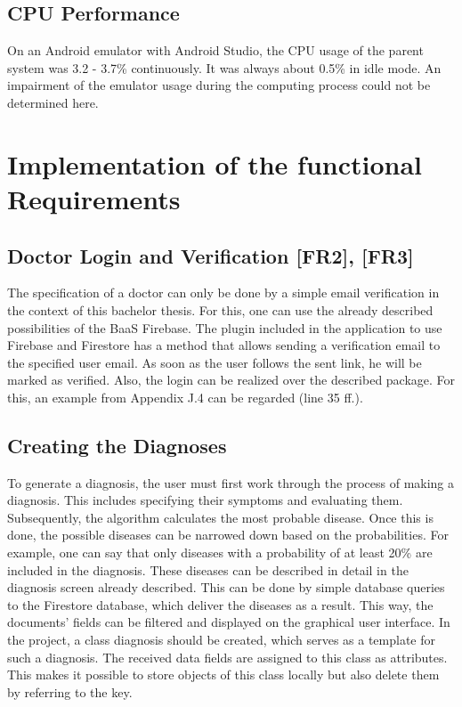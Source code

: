 \subsection{CPU Performance}
On an Android emulator with Android Studio, the CPU usage of the parent system was 3.2 - 3.7\% continuously. It was always about 0.5\% in idle mode. An impairment of the emulator usage during the computing process could not be determined here.

\section{Implementation of the functional Requirements}
\subsection{Doctor Login and Verification [FR2], [FR3]}
The specification of a doctor can only be done by a simple email verification in the context of this bachelor thesis. For this, one can use the already described possibilities of the BaaS Firebase. The plugin included in the application to use Firebase and Firestore has a method that allows sending a verification email to the specified user email. As soon as the user follows the sent link, he will be marked as verified. Also, the login can be realized over the described package. For this, an example from Appendix J.4 can be regarded (line 35 ff.).
\subsection{Creating the Diagnoses}
To generate a diagnosis, the user must first work through the process of making a diagnosis. This includes specifying their symptoms and evaluating them. Subsequently, the algorithm calculates the most probable disease. Once this is done, the possible diseases can be narrowed down based on the probabilities. For example, one can say that only diseases with a probability of at least 20\% are included in the diagnosis. These diseases can be described in detail in the diagnosis screen already described. This can be done by simple database queries to the Firestore database, which deliver the diseases as a result. This way, the documents' fields can be filtered and displayed on the graphical user interface. In the project, a class diagnosis should be created, which serves as a template for such a diagnosis. The received data fields are assigned to this class as attributes. This makes it possible to store objects of this class locally but also delete them by referring to the key.
